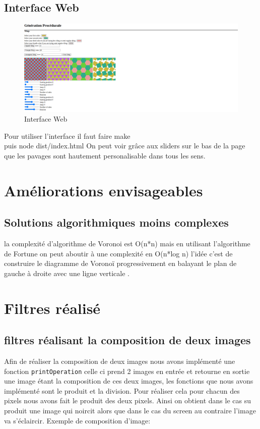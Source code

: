 \documentclass[a4paper,10pt]{article}
\begin{document}
\subsection{Interface Web}

\begin{figure}[h]
    \centering
    \includegraphics[scale=0.5]{web_interface.png}
    \caption{Interface Web}
\end{figure}
Pour utiliser l'interface il faut faire
make \\
puis node dist/index.html
On peut voir grâce aux sliders sur le bas de la page que les pavages sont hautement personalisable dans tous les sens.




\section{Améliorations envisageables}
\subsection{Solutions algorithmiques moins complexes}
la complexité d'algorithme de Voronoi est O(n*n) mais en utilisant l'algorithme de Fortune on peut aboutir à une complexité en O(n*log n) l'idée c'est de construire le diagramme de Voronoï progressivement en balayant le plan de gauche à droite avec une ligne verticale .


\section{Filtres réalisé}
\subsection{filtres réalisant la composition de deux images}
Afin de réaliser la composition de deux images nous avons implémenté une fonction \texttt{printOperation} celle ci prend 2 images en entrée et retourne en sortie une image étant la composition de ces deux images, les fonctions que nous avons implémenté sont le produit et la division. Pour réaliser cela pour chacun des pixels nous avons fait le produit des deux pixels. Ainsi on obtient dans le cas su produit une image qui noircit alors que dans le cas du screen au contraire l'image va s'éclaircir. Exemple de composition d'image:\\
\end{document}
